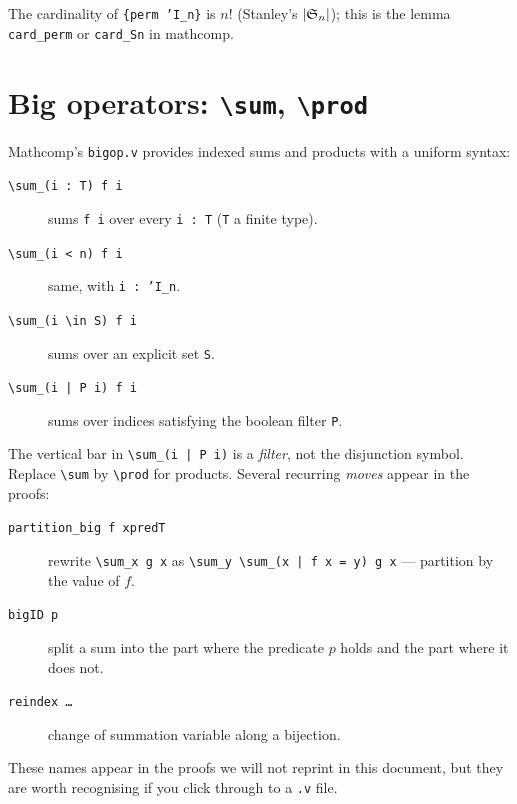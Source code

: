 \noindent The cardinality of \texttt{\{perm 'I\_n\}} is $n!$
(Stanley's $|\mathfrak{S}_{n}|$); this is the lemma \texttt{card\_perm} or
\texttt{card\_Sn} in mathcomp.

\section{Big operators: \texttt{\textbackslash sum}, \texttt{\textbackslash prod}}

Mathcomp's \texttt{bigop.v} provides indexed sums and products with
a uniform syntax:

\begin{description}
  \item[\texttt{\textbackslash sum\_(i\ :\ T) f i}] sums \texttt{f i}
    over every \texttt{i : T} (\texttt{T} a finite type).
  \item[\texttt{\textbackslash sum\_(i\ <\ n) f i}] same, with
    \texttt{i : 'I\_n}.
  \item[\texttt{\textbackslash sum\_(i\ \textbackslash in\ S) f i}]
    sums over an explicit set \texttt{S}.
  \item[\texttt{\textbackslash sum\_(i\ |\ P i) f i}] sums over
    indices satisfying the boolean filter \texttt{P}.
\end{description}

\noindent The vertical bar in \texttt{\textbackslash sum\_(i\ |\ P i)}
is a \emph{filter}, not the disjunction symbol. Replace
\texttt{\textbackslash sum} by \texttt{\textbackslash prod} for
products. Several recurring \emph{moves} appear in the proofs:

\begin{description}
  \item[\texttt{partition\_big f xpredT}] rewrite
    \texttt{\textbackslash sum\_x g x} as
    \texttt{\textbackslash sum\_y \textbackslash sum\_(x\ |\ f x = y) g x}
    --- partition by the value of $f$.
  \item[\texttt{bigID p}] split a sum into the part where the
    predicate $p$ holds and the part where it does not.
  \item[\texttt{reindex \ldots}] change of summation variable along
    a bijection.
\end{description}

\noindent These names appear in the proofs we will not reprint in
this document, but they are worth recognising if you click through
to a \texttt{.v} file.

